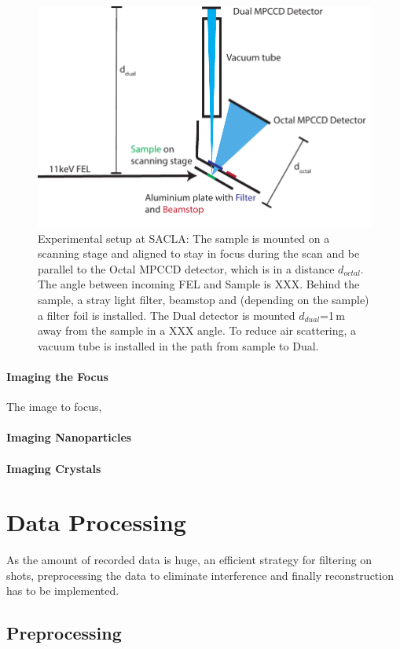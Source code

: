 \begin{figure}
	\centering
	\includegraphics[width=0.8\linewidth]{images/setup.pdf}
	\caption[Experimental setup at SACLA]{Experimental setup at SACLA: The sample is mounted on a scanning stage and aligned to stay in focus during the scan and be parallel to the Octal MPCCD detector, which is in a distance $d_{octal}$. The angle between incoming FEL and Sample is XXX. Behind the sample, a stray light filter, beamstop and (depending on the sample) a filter foil is installed. The Dual detector is mounted $d_{dual}$=1\,m away from the sample in a XXX angle. To reduce air scattering, a vacuum tube is installed in the path from sample to Dual.}
	\label{fig:setup}
\end{figure}
\paragraph{Imaging the Focus}
The image to focus, 
\paragraph{Imaging Nanoparticles}
\paragraph{Imaging Crystals}

\section{Data Processing}
As the amount of recorded data is huge, an efficient strategy for filtering on shots, preprocessing the data to eliminate interference and finally reconstruction has to be implemented.
\subsection{Preprocessing}









